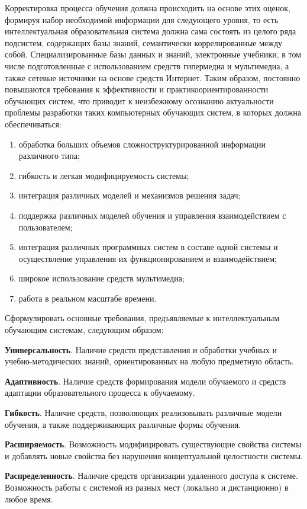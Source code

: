Корректировка процесса обучения должна происходить на основе этих оценок, формируя набор необходимой информации для следующего уровня, то есть интеллектуальная образовательная система должна сама состоять из целого ряда подсистем, содержащих базы знаний, семантически коррелированные между собой.
Специализированные базы данных и знаний, электронные учебники, в том числе подготовленные с использованием средств гипермедиа и мультимедиа, а также сетевые источники на основе средств Интернет. Таким образом, постоянно повышаются требования к эффективности и практикоориентированности обучающих систем, что приводит к неизбежному осознанию актуальности проблемы разработки таких компьютерных обучающих систем, в которых должна обеспечиваться:
\begin{enumerate}
	\item обработка больших объемов сложноструктурированной информации различного типа;
	\item гибкость и легкая модифицируемость системы;
	\item интеграция различных моделей и механизмов решения задач;
	\item поддержка различных моделей обучения и управления взаимодействием с пользователем;
	\item интеграция различных программных систем в составе одной системы и осуществление управления их функционированием и взаимодействием;
	\item широкое использование средств мультимедиа;
	\item работа в реальном масштабе времени.
\end{enumerate}

Сформулировать основные требования, предъявляемые к интеллектуальным обучающим системам, следующим образом:

\begin{textitemize}
	\item \textbf{Универсальность}. Наличие средств представления и обработки учебных и учебно-методических знаний, ориентированных на любую предметную область.
	\item \textbf{Адаптивность}. Наличие средств формирования модели обучаемого и средств адаптации образовательного процесса к обучаемому.
	\item \textbf{Гибкость}. Наличие средств, позволяющих реализовывать различные модели обучения, а также поддерживающих различные формы обучения.
	\item \textbf{Расширяемость}. Возможность модифицировать существующие свойства системы и добавлять новые свойства без нарушения концептуальной целостности системы.
	\item \textbf{Распределенность}. Наличие средств организации удаленного доступа к системе. Возможность работы с системой из разных мест (локально и дистанционно) в любое время.
\end{textitemize}

